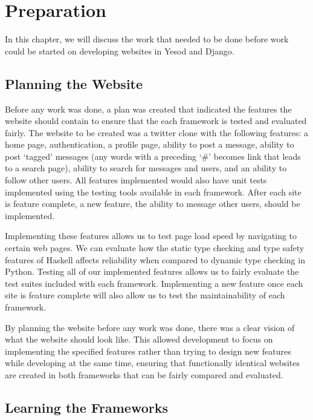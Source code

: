 \chapter{Preparation}
\label{chap:Preparation}

In this chapter, we will discuss the work that needed to be done before work could
be started on developing websites in Yesod and Django.

\section{Planning the Website}

Before any work was done, a plan was created that indicated the features the
website should contain to ensure that the each framework is tested and
evaluated fairly. The website to be created was a twitter
clone with the following features: a home page, authentication, a profile page,
ability to post a message, ability to post `tagged' messages (any words with
a preceding `\#' becomes link that leads to a search page),
ability to search for messages and users, and an ability to follow other users.
All features implemented would also have unit tests implemented using the
testing tools available in each framework. After each site is feature complete,
a new feature, the ability to message other users, should be implemented.

Implementing these features allows us to test page load speed by navigating
to certain web pages. We can evaluate how the static type checking and type safety features of 
Haskell affects reliability when compared to dynamic type checking in Python. Testing
all of our implemented features allows us to fairly evaluate the
test suites included with each framework. Implementing a new feature once each
site is feature complete will also allow us to test the maintainability of
each framework.

By planning the website before any work was done, there was a clear vision of
what the website should look like. This allowed development to focus on implementing
the specified features rather than trying to design new features while developing
at the same time, ensuring that functionally identical websites are created in both
frameworks that can be fairly compared and evaluated.

\section{Learning the Frameworks}

